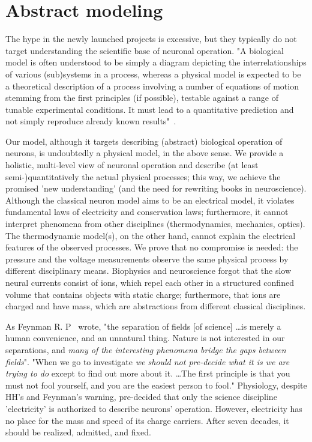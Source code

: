 
\section{Abstract modeling\label{sec:SINGLE_ABSTRACT_NEURON}}


The hype in the newly launched projects is excessive, but
they typically do not target understanding the scientific base
of neuronal operation.
"A biological model is often understood to be simply a diagram depicting the interrelationships of various (sub)systems in a process, whereas a physical model is expected to be a theoretical description of a process involving a number of equations of motion stemming from the first principles (if possible), testable against a range of tunable experimental conditions. It must lead to a quantitative prediction and not simply reproduce already known results"~\cite{MolecularBiophysics:2003}.


Our model, although it targets describing (abstract) biological operation of neurons, is undoubtedly a physical model, in the above sense.
We provide a holistic, multi-level view of neuronal operation and describe (at least semi-)quantitatively the actual physical processes; this way, 
we achieve the promised 'new understanding' (and the need for rewriting books in neuroscience). Although the classical neuron model aims to be an electrical model, it violates fundamental laws of electricity and conservation laws; furthermore, it cannot interpret phenomena from other disciplines (thermodynamics, mechanics, optics). The thermodynamic model(s), on the other hand, cannot explain the electrical features of the observed processes.
We prove that no compromise is needed: the pressure and the voltage
measurements observe the same physical process by different disciplinary means. Biophysics and neuroscience forgot that the slow neural currents consist of ions, which repel each other in a structured confined volume that contains objects with static charge; furthermore, that ions are charged and have mass, which are abstractions from different classical disciplines. 

As Feynman R. P~\cite{FeynmanThinking:1980} wrote, "the separation of fields [of science] \dots is merely a human convenience, and an unnatural thing.
Nature is not interested in our separations, and \textit{many of the interesting phenomena bridge the gaps between fields}".
"When we go to investigate \textit{we should not pre-decide what it is we are trying to do} except to find out more about it. \dots The first principle is that you must not fool yourself, and you are the easiest person to fool."
Physiology, despite \gls{HH}'s and Feynman's warning, pre-decided that only the science discipline 'electricity' is authorized to describe neurons' operation.
However, electricity has no place for the mass and speed of its charge carriers. After seven decades, it should be realized, admitted, and fixed.

